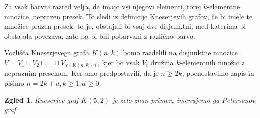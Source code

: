 \documentclass[a4paper,12pt]{article}
\newtheorem{zgled}{Zgled}
\begin{document}
Za vsak barvni razred velja, da imajo vsi njegovi elementi, torej $k$-elementne množice, neprazen presek. To sledi iz definicije Kneserjevih grafov, če bi imele te množice prazen presek, to je, obstajali bi vsaj dve disjunktni, med katerima bi obstajala povezava, zato pa bi bili pobarvani z različno barvo.

Vozlišča Kneserjevega grafa $K(n,k)$ bomo razdelili na disjunktne množice $V = V_1 \sqcup V_2 \sqcup \ldots \sqcup V_{\chi(K(n,k))}$, kjer bo vsak $V_i$ družina $k$-elementnih množic z nepraznim presekom. Ker smo predpostavili, da je $n \geq 2k$, poenostavimo zapis in pišimo $n = 2k + d, k \geq 1, d \geq 0$.

\newpage
\begin{zgled}{Kneserjev graf $K(5,2)$ je zelo znan primer, imenujemo ga Petersenov graf. 

}
\end{zgled}
\end{document}
